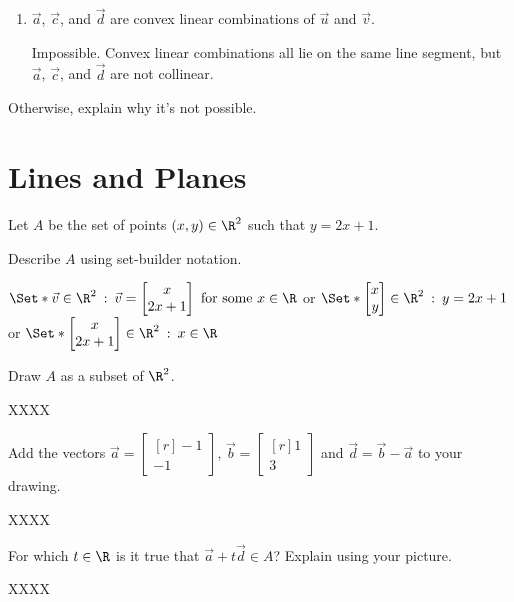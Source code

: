 \documentclass{problemset}
\newcommand{\mat}[1]{\begin{bmatrix*}[r]#1\end{bmatrix*}}
\newcommand{\matc}[1]{\begin{bmatrix}#1\end{bmatrix}}
\providecommand\given{}
\newcommand\SetSymbol[1][]{%
	\nonscript\::%
	\allowbreak
	\nonscript\:
	\mathopen{}}
\renewcommand\given{\SetSymbol[\delimsize]}
\begin{document}
\begin{parts}
\begin{enumerate}
				\item $\vec a$, $\vec c$, and $\vec d$ are convex linear
					combinations of $\vec u$ and $\vec v$.
				\begin{solution}
					Impossible. Convex linear combinations all lie on the same line segment,
					but $\vec a$, $\vec c$, and $\vec d$ are not collinear.
				\end{solution}
			\end{enumerate}Otherwise, explain why it's not possible.
	\end{parts}

\section*{Lines and Planes}

	\question
	Let $A$ be the set of points $(x,y)\in\R^2$ such that $y=2x+1$.
	\begin{parts}
		\item Describe $A$ using set-builder notation.
			\begin{solution}
				$\Set*{\vec v\in\R^2 \given \vec v=\matc{x\\2x+1}\text{ for some } x\in\R}$
				or
				$\Set*{\mat{x\\y}\in\R^2 \given y=2x+1}$
				or
				$\Set*{\matc{x\\2x+1}\in\R^2 \given x\in\R}$
			\end{solution}
		\item Draw $A$ as a subset of $\R^2$.
			\begin{solution}
				XXXX
			\end{solution}
		\item Add the vectors $\vec a=\mat{-1\\-1}$, $\vec b=\mat{1\\3}$ and
			$\vec d=\vec b-\vec a$ to your drawing.
			\begin{solution}
				XXXX
			\end{solution}
		\item For which $t\in\R$ is it true that $\vec a+t\vec d\in A$? Explain using your picture.
			\begin{solution}
				XXXX
			\end{solution}
	\end{parts}
\end{document}
